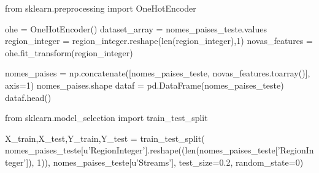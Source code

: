 \documentclass[11pt]{article}
\newenvironment{Shaded}{}{}
\newcommand{\DecValTok}[1]{\textcolor[rgb]{0.25,0.63,0.44}{{#1}}}
\newcommand{\FloatTok}[1]{\textcolor[rgb]{0.25,0.63,0.44}{{#1}}}
\newcommand{\StringTok}[1]{\textcolor[rgb]{0.25,0.44,0.63}{{#1}}}
\newcommand{\CommentTok}[1]{\textcolor[rgb]{0.38,0.63,0.69}{\textit{{#1}}}}
\newcommand{\NormalTok}[1]{{#1}}
\newcommand{\SpecialCharTok}[1]{\textcolor[rgb]{0.25,0.44,0.63}{{#1}}}
\newcommand{\ImportTok}[1]{{#1}}
\newcommand{\VariableTok}[1]{\textcolor[rgb]{0.10,0.09,0.49}{{#1}}}
\newcommand{\OperatorTok}[1]{\textcolor[rgb]{0.40,0.40,0.40}{{#1}}}
\newcommand{\BuiltInTok}[1]{{#1}}
\begin{document}
    \begin{Shaded}
\begin{Highlighting}[]
    \ImportTok{from}\NormalTok{ sklearn.preprocessing }\ImportTok{import}\NormalTok{ OneHotEncoder}

\NormalTok{    ohe }\OperatorTok{=}\NormalTok{ OneHotEncoder()}
\NormalTok{    dataset_array }\OperatorTok{=}\NormalTok{ nomes_paises_teste.values}
\NormalTok{    region_integer }\OperatorTok{=}\NormalTok{ region_integer.reshape(}\BuiltInTok{len}\NormalTok{(region_integer),}\DecValTok{1}\NormalTok{)}
\NormalTok{    novas_features }\OperatorTok{=}\NormalTok{ ohe.fit_transform(region_integer)}

\NormalTok{    nomes_paises }\OperatorTok{=}\NormalTok{ np.concatenate([nomes_paises_teste, novas_features.toarray()], axis}\OperatorTok{=}\DecValTok{1}\NormalTok{)}
\NormalTok{    nomes_paises.shape}
\NormalTok{    dataf }\OperatorTok{=}\NormalTok{ pd.DataFrame(nomes_paises_teste)}
\NormalTok{    dataf.head()}
\end{Highlighting}
\end{Shaded}

    \begin{Shaded}
\begin{Highlighting}[]
    \ImportTok{from}\NormalTok{ sklearn.model_selection }\ImportTok{import}\NormalTok{ train_test_split}


\NormalTok{    X_train,X_test,Y_train,Y_test }\OperatorTok{=}\NormalTok{ train_test_split(}
\NormalTok{        nomes_paises_teste[}\StringTok{u'RegionInteger'}\NormalTok{].reshape((}\BuiltInTok{len}\NormalTok{(nomes_paises_teste[}\StringTok{'RegionInteger'}\NormalTok{]), }\DecValTok{1}\NormalTok{)), }
\NormalTok{        nomes_paises_teste[}\StringTok{u'Streams'}\NormalTok{], }
\NormalTok{        test_size}\OperatorTok{=}\FloatTok{0.2}\NormalTok{, random_state}\OperatorTok{=}\DecValTok{0}\NormalTok{)}
\end{Highlighting}
\end{Shaded}

    \begin{Shaded}
\end{Shaded}
\end{document}
